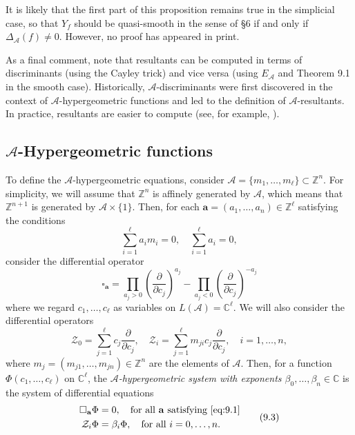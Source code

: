 \documentclass{amsart}
\theoremstyle{plain}
\theoremstyle{definition}
\begin{document}
	It is likely that the first part of this proposition remains
true in the simplicial case, so that $Y_f$ should be quasi-smooth in
the sense of \S6 if and only if $\Delta_{\mathcal{A}}(f) \ne 0$.  However,
no proof has appeared in print.

	As a final comment, note that resultants can be computed in
terms of discriminants (using the Cayley trick) and vice versa (using
$E_{\mathcal{A}}$ and Theorem 9.1 in the smooth case).  Historically,
$\mathcal{A}$-discriminants were first discovered in the context of
$\mathcal{A}$-hypergeometric functions and led to the definition of
$\mathcal{A}$-resultants.  In practice, resultants are easier to compute
(see, for example, \cite{Stu4}).

	\subsection{\texorpdfstring{$\mathcal{A}$}{A}-Hypergeometric functions} To
define the $\mathcal{A}$-hypergeometric equations, consider $\mathcal{A} =
\{m_1,\dots,m_\ell\} \subset \mathbb{Z}^n$.  For simplicity, we will
assume that $\mathbb{Z}^n$ is affinely generated by $\mathcal{A}$, which
means that $\mathbb{Z}^{n+1}$ is generated by $\mathcal{A}\times\{1\}$.
Then, for each $\mathbf{a} = (a_1,\dots,a_n) \in \mathbb{Z}^\ell$
satisfying the conditions
\begin{equation}
\sum_{i=1}^\ell a_im_i = 0,\quad \sum_{i=1}^\ell a_i = 0,
\tag{9.1}\label{eq:9.1}
\end{equation}
consider the differential operator
\begin{equation}
\square_{\mathbf{a}} = \prod_{a_j > 0} \left(\frac{\partial}{\partial c_j}
\right)^{a_j} - \prod_{a_j < 0} \left(\frac{\partial}{\partial c_j}
\right)^{-a_j}
\tag{9.2}\label{eq:9.2}
\end{equation}
where we regard $c_1,\dots,c_\ell$ as variables on $L(\mathcal{A}) = \mathbb{C}^\ell$.  We will also consider the differential operators
\[
\mathcal{Z}_0 = \sum_{j=1}^\ell c_j
\frac{\partial}{\partial c_j}, \quad
	\mathcal{Z}_i = \sum_{j=1}^\ell m_{ji} c_j
\frac{\partial}{\partial c_j},\quad i = 1,\dots,n,
\]
where $m_j = (m_{j1},\dots,m_{jn}) \in \mathbb{Z}^n$ are the elements of
$\mathcal{A}$.  Then, for a function $\Phi(c_1,\dots,c_\ell)$ on $\mathbb{C}^\ell$, the {\it $\mathcal{A}$-hypergeometric system with exponents
$\beta_0,\dots,\beta_n \in \mathbb{C}$\/} is the system of differential
equations
\begin{equation}
\begin{aligned} \square_{\mathbf{a}} \Phi &= 0,\quad \hbox{for all $\mathbf{a}$
satisfying \eqref{eq:9.1}}\\
	\mathcal{Z}_i\Phi &= \beta_i \Phi,\quad \hbox{for all $i =
0,\dots,n$.} 
\end{aligned}
\tag{9.3}\label{eq:9.3}
\end{equation}
\end{document}
